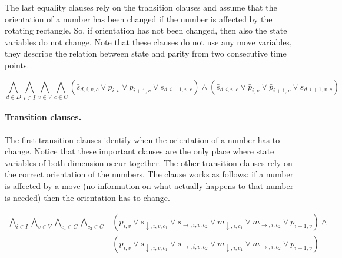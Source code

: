 \documentclass[]{llncs}
\begin{document}
The last equality clauses rely on the transition clauses and assume that the orientation of a number has been changed if
the number is affected by the rotating rectangle. So, if orientation has not been changed, then also the state variables
do not change. Note that these clauses do not use any move variables, they describe the relation between state and
parity from two consecutive time points. 
%
%

\begin{equation}
\bigwedge_{d\in D} \bigwedge_{i\in I} \bigwedge_{v\in V} \bigwedge_{c\in C} (\bar s_{d,i,v,c} \vee p_{i,v} \vee
p_{i+1,v} \vee s_{d,i+1,v,c}) \wedge (\bar s_{d,i,v,c} \vee \bar p_{i,v} \vee \bar p_{i+1,v} \vee s_{d,i+1,v,c})
\end{equation}

\paragraph{Transition clauses.}
%
% 

The first transition clauses identify when the orientation of a number has to change. Notice that these important
clauses are the only place where state variables of both dimension occur together. The other transition clauses rely on
the correct orientation of the numbers. The clause works as follows: if a number is affected by a move (no information
on what actually happens to that number is needed) then the orientation has to change. 

\begin{equation}
\begin{array}{ll}
\bigwedge_{i\in I} \bigwedge_{v\in V} \bigwedge_{c_1\in C} \bigwedge_{c_2\in C} & (\bar p_{i,v} \vee \bar s_{\downarrow,i,v,c_1} \vee
\bar s_{\rightarrow,i,v,c_2} \vee \bar m_{\downarrow,i,c_1} \vee \bar m_{\rightarrow,i,c_2} \vee \bar p_{i+1,v}) \wedge\\  
 & (p_{i,v} \vee \bar s_{\downarrow,i,v,c_1} \vee \bar s_{\rightarrow,i,v,c_2} \vee \bar m_{\downarrow,i,c_1} \vee \bar m_{\rightarrow,i,c_2} \vee p_{i+1,v})
\end{array}
\end{equation}
\end{document}
